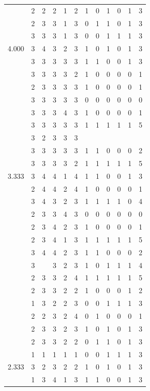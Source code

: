 \documentclass[]{msu-thesis}
\theoremstyle{definition}
\theoremstyle{definition}
\theoremstyle{definition}
\theoremstyle{remark}
\begin{document}
\begin{table}
{\begin{tabular}[t]{rrrrrrrrrrrr}
 & 2 & 2 & 2 & 1 & 2 & 1 & 0 & 1 & 0 & 1 & 3\\
 & 2 & 3 & 3 & 1 & 3 & 0 & 1 & 1 & 0 & 1 & 3\\
 & 3 & 3 & 3 & 1 & 3 & 0 & 0 & 1 & 1 & 1 & 3\\
4.000 & 3 & 4 & 3 & 2 & 3 & 1 & 0 & 1 & 0 & 1 & 3\\
 & 3 & 3 & 3 & 3 & 3 & 1 & 1 & 0 & 0 & 1 & 3\\
 & 3 & 3 & 3 & 3 & 2 & 1 & 0 & 0 & 0 & 0 & 1\\
 & 2 & 3 & 3 & 3 & 3 & 1 & 0 & 0 & 0 & 0 & 1\\
 & 3 & 3 & 3 & 3 & 3 & 0 & 0 & 0 & 0 & 0 & 0\\
 & 3 & 3 & 3 & 4 & 3 & 1 & 0 & 0 & 0 & 0 & 1\\
 & 3 & 3 & 3 & 3 & 3 & 1 & 1 & 1 & 1 & 1 & 5\\
 & 3 & 2 & 3 & 3 & 3 &  &  &  &  &  & \\
 & 3 & 3 & 3 & 3 & 3 & 1 & 1 & 0 & 0 & 0 & 2\\
 & 3 & 3 & 3 & 3 & 2 & 1 & 1 & 1 & 1 & 1 & 5\\
3.333 & 3 & 4 & 4 & 1 & 4 & 1 & 1 & 0 & 0 & 1 & 3\\
 & 2 & 4 & 4 & 2 & 4 & 1 & 0 & 0 & 0 & 0 & 1\\
 & 3 & 4 & 3 & 2 & 3 & 1 & 1 & 1 & 1 & 0 & 4\\
 & 2 & 3 & 3 & 4 & 3 & 0 & 0 & 0 & 0 & 0 & 0\\
 & 2 & 3 & 4 & 2 & 3 & 1 & 0 & 0 & 0 & 0 & 1\\
 & 2 & 3 & 4 & 1 & 3 & 1 & 1 & 1 & 1 & 1 & 5\\
 & 3 & 4 & 4 & 2 & 3 & 1 & 1 & 0 & 0 & 0 & 2\\
 & 3 &  & 3 & 2 & 3 & 1 & 0 & 1 & 1 & 1 & 4\\
 & 2 & 3 & 3 & 2 & 4 & 1 & 1 & 1 & 1 & 1 & 5\\
 & 2 & 3 & 3 & 2 & 2 & 1 & 0 & 0 & 0 & 1 & 2\\
 & 1 & 3 & 2 & 2 & 3 & 0 & 0 & 1 & 1 & 1 & 3\\
 & 2 & 2 & 3 & 2 & 4 & 0 & 1 & 0 & 0 & 0 & 1\\
 & 2 & 3 & 3 & 2 & 3 & 1 & 0 & 1 & 0 & 1 & 3\\
 & 2 & 3 & 3 & 2 & 2 & 0 & 1 & 1 & 0 & 1 & 3\\
 & 1 & 1 & 1 & 1 & 1 & 0 & 0 & 1 & 1 & 1 & 3\\
2.333 & 3 & 2 & 3 & 2 & 2 & 1 & 0 & 1 & 0 & 1 & 3\\
 & 1 & 3 & 4 & 1 & 3 & 1 & 1 & 0 & 0 & 1 & 3\\

\end{tabular}}
\end{table}
\end{document}
